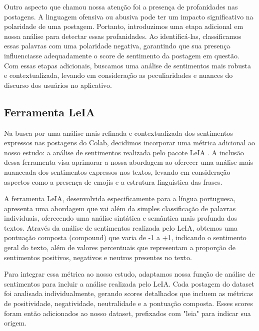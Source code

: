 Outro aspecto que chamou nossa atenção foi a presença de profanidades nas postagens. A linguagem ofensiva ou abusiva pode ter um impacto significativo na polaridade de uma postagem. Portanto, introduzimos uma etapa adicional em nossa análise para detectar essas profanidades. Ao identificá-las, classificamos essas palavras com uma polaridade negativa, garantindo que sua presença influenciasse adequadamente o score de sentimento da postagem em questão. Com essas etapas adicionais, buscamos uma análise de sentimentos mais robusta e contextualizada, levando em consideração as peculiaridades e nuances do discurso dos usuários no aplicativo.

\subsection{Ferramenta LeIA}

Na busca por uma análise mais refinada e contextualizada dos sentimentos expressos nas postagens do Colab, decidimos incorporar uma métrica adicional ao nosso estudo: a análise de sentimentos realizada pelo pacote LeIA \cite{2018_Almeida_PAGE}. A inclusão dessa ferramenta visa aprimorar a nossa abordagem ao oferecer uma análise mais nuanceada dos sentimentos expressos nos textos, levando em consideração aspectos como a presença de emojis e a estrutura linguística das frases.

A ferramenta LeIA, desenvolvida especificamente para a língua portuguesa, apresenta uma abordagem que vai além da simples classificação de palavras individuais, oferecendo uma análise sintática e semântica mais profunda dos textos. Através da análise de sentimentos realizada pelo LeIA, obtemos uma pontuação composta (compound) que varia de -1 a +1, indicando o sentimento geral do texto, além de valores percentuais que representam a proporção de sentimentos positivos, negativos e neutros presentes no texto.

Para integrar essa métrica ao nosso estudo, adaptamos nossa função de análise de sentimentos para incluir a análise realizada pelo LeIA. Cada postagem do dataset foi analisada individualmente, gerando scores detalhados que incluem as métricas de positividade, negatividade, neutralidade e a pontuação composta. Esses scores foram então adicionados ao nosso dataset, prefixados com "leia" para indicar sua origem.

